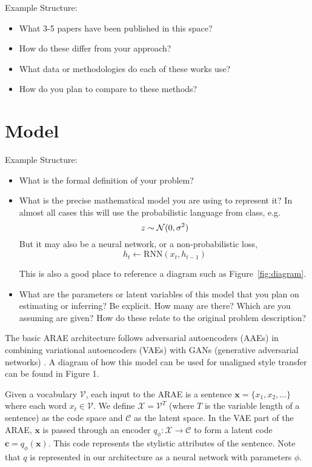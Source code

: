 \documentclass{article}
\newcommand{\vect}[1]{\boldsymbol{#1}}
\begin{document}
Example Structure:
\begin{itemize}
\item What 3-5 papers have been published in this space?
\item How do these  differ from your approach?
\item What data or methodologies do each of these works use?
\item How do you plan to compare to these methods?
\end{itemize}

\lipsum[7-9]


\section{Model}

Example Structure:

\begin{itemize}
\item What is the formal definition of your problem?
\item What is the precise mathematical model you are using to represent it? In almost all cases this will use the probabilistic language from class, e.g.
  \begin{equation}
  z \sim {\cal N}(0, \sigma^2)\label{eq:1}
\end{equation}
But it may also be a neural network, or a non-probabilistic loss,
\[ h_t \gets \mathrm{RNN}(x_{t}, h_{t-1} )\]

This is also a good place to reference a diagram such as Figure~\ref{fig:diagram}.

\item What are the parameters or latent variables of this model that you plan on estimating or inferring? Be explicit. How many are there? Which are you assuming are given? How do these relate to the original problem description?
\end{itemize}

The basic ARAE architecture follows adversarial autoencoders (AAEs) in combining variational autoencoders (VAEs) with GANs (generative adversarial networks) \cite{arae}.  A diagram of how this model can be used for unaligned style transfer can be found in Figure 1.

Given a vocabulary $\mathcal{V}$, each input to the ARAE is a sentence $\vect{x} = \{x_1, x_2, \ldots\}$ where each word $x_t \in \mathcal{V}$.  We define $\mathcal{X} = \mathcal{V}^T$ (where $T$ is the variable length of a sentence) as the code space and $\mathcal{C}$ as the latent space.  In the VAE part of the ARAE, $\vect{x}$ is passed through an encoder $q_\phi : \mathcal{X} \to \mathcal{C}$ to form a latent code $\vect{c} = q_\phi(\vect{x})$.  This code represents the stylistic attributes of the sentence.  Note that $q$ is represented in our architecture as a neural network with parameters $\phi$.
\end{document}

